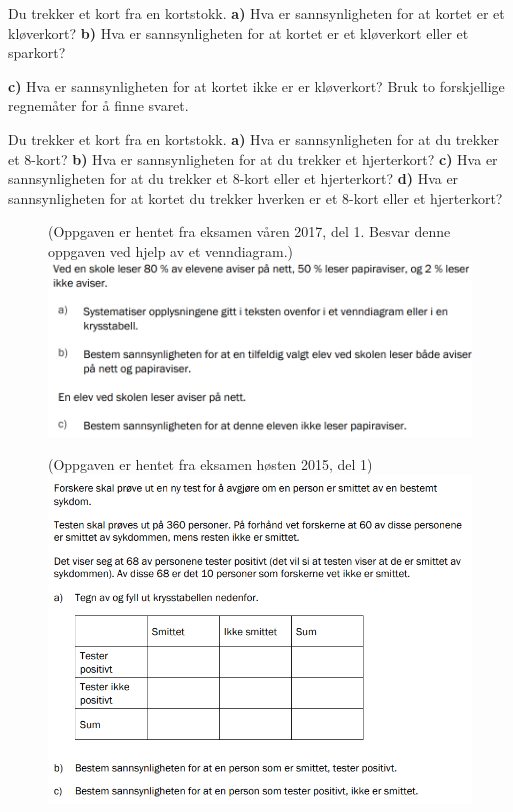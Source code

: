 

%

\opgt

\nes 

Du trekker et kort fra en kortstokk.\os
\textbf{a)} Hva er sannsynligheten for at kortet er et kløverkort?\os
\textbf{b)} Hva er sannsynligheten for at kortet er et kløverkort eller et sparkort?\os

\textbf{c)} Hva er sannsynligheten for at kortet ikke er er kløverkort? Bruk to forskjellige regnemåter for å finne svaret.

Du trekker et kort fra en kortstokk.\os
\textbf{a)} Hva er sannsynligheten for at du trekker et 8-kort?\os
\textbf{b)} Hva er sannsynligheten for at du trekker et hjerterkort?\os
\textbf{c)} Hva er sannsynligheten for at du trekker et 8-kort eller et hjerterkort?\os
\textbf{d)} Hva er sannsynligheten for at kortet du trekker hverken er et 8-kort eller et hjerterkort?

\begin{figure}
	(Oppgaven er hentet fra eksamen våren 2017, del 1. Besvar denne oppgaven ved hjelp av et venndiagram.)\os
	\includegraphics[scale=0.4]{v17_d1_8}
\end{figure}
\newpage
{}
\begin{figure}
	(Oppgaven er hentet fra eksamen høsten 2015, del 1)\\
	\includegraphics[scale=0.45]{h15_d1_7}
\end{figure}

